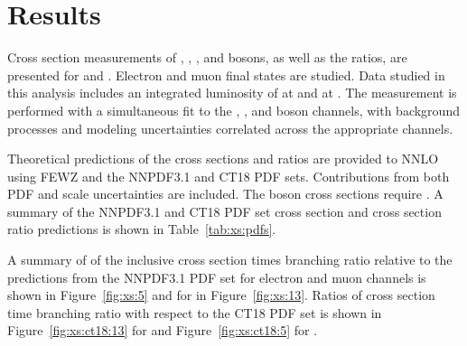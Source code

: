 \chapter{Results}\label{ch:results}
Cross section measurements of \Wp, \Wm, \W, and \Z bosons, as well as the ratios, are presented for \sg and \sh. Electron and muon final states are studied. Data studied in this analysis includes an integrated luminosity of \lumig at \sg and \lumih at \sh. The measurement is performed with a simultaneous fit to the \Wp, \Wm, and \Z boson channels, with background processes and modeling uncertainties correlated across the appropriate channels. 

Theoretical predictions of the cross sections and ratios are provided to NNLO using FEWZ and the NNPDF3.1 and CT18 PDF sets. Contributions from both PDF and scale uncertainties are included. The \Z boson cross sections require \masswindow. A summary of the NNPDF3.1 and CT18 PDF set cross section and cross section ratio predictions is shown in Table~\ref{tab:xs:pdfs}.

A summary of of the inclusive cross section times branching ratio relative to the predictions from the NNPDF3.1 PDF set for \sg electron and muon channels is shown in Figure~\ref{fig:xs:5} and for \sh in Figure~\ref{fig:xs:13}. Ratios of cross section time branching ratio with respect to the CT18 PDF set is shown in Figure~\ref{fig:xs:ct18:13} for \sh and Figure~\ref{fig:xs:ct18:5} for \sg.









%

% 
% 


